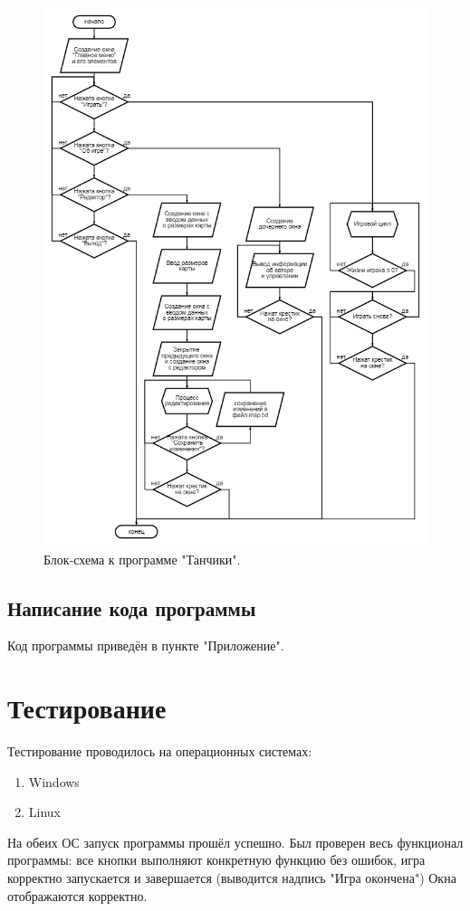 \begin{figure}[H]
    \centering
    \includegraphics[width=1\textwidth]{./images/block-scheme.png}
    \caption{\centering\label{fig:example05}Блок-схема к программе "Танчики".}
\end{figure}

\subsection{\label{sec:ch01/sec03/sub04}
Написание кода программы}
Код программы приведён в пункте "Приложение".

\section{\label{sec:ch02/sec04}Тестирование}
Тестирование проводилось на операционных системах:
\begin{enumerate}
\item Windows
\item Linux
\end{enumerate}
На обеих ОС запуск программы прошёл успешно. Был проверен весь функционал программы: все кнопки выполняют конкретную функцию без ошибок, игра корректно запускается и завершается (выводится надпись "Игра окончена") Окна отображаются корректно.


